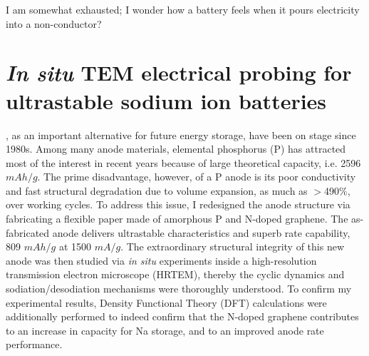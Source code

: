 
\begin{savequote}[75mm] 
I am somewhat exhausted; I wonder how a battery feels when it pours electricity into a non-conductor?
\end{savequote}

\chapter{\emph{In situ} TEM electrical probing for ultrastable sodium ion batteries}

, as an important alternative for future energy storage, have been on stage since 1980s. Among many anode materials, elemental phosphorus (P) has attracted most of the interest in recent years because of  large theoretical capacity, i.e. 2596 $mAh/g$. The prime disadvantage, however, of a P anode is its poor conductivity and fast structural degradation due to volume expansion, as much as $>$490$\%$, over working cycles. To address this issue, I redesigned the anode structure via fabricating a flexible paper made of amorphous P and N-doped graphene. The as-fabricated anode delivers ultrastable characteristics and superb rate capability, 809 $mAh/g$ at 1500 $mA/g$. The extraordinary structural integrity of this new anode was then studied via \emph{in situ} experiments inside a high-resolution transmission electron microscope (HRTEM), thereby the cyclic dynamics and sodiation/desodiation mechanisms were thoroughly understood. To confirm my experimental results, Density Functional Theory (DFT) calculations were additionally performed to indeed confirm that the N-doped graphene contributes to an increase in capacity for Na storage, and to an improved anode rate performance.

